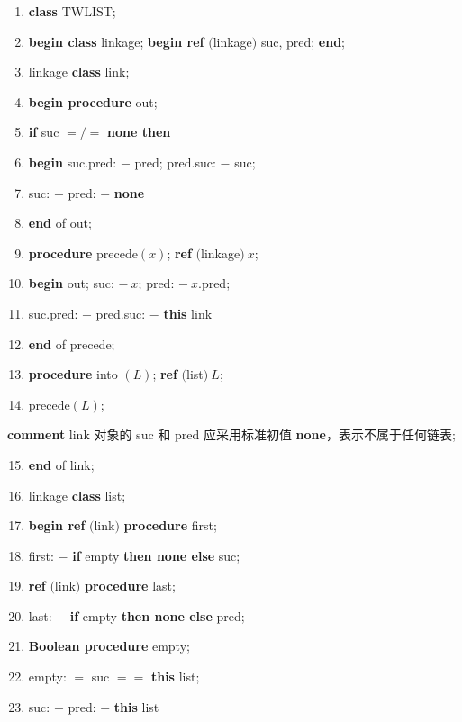 \documentclass[twoside,11pt,fontset=none]{ctexbook}
\begin{document}
\begin{enumerate}[nosep, label=\arabic*.]
	\item \textbf{class} TWLIST;
	\item \textbf{begin class} linkage; \textbf{begin ref} $($linkage$)$ suc, pred; \textbf{end};
	\item \quad linkage \textbf{class} link;
	\item \quad \textbf{begin procedure} out;
	\item \quad \quad \textbf{if} suc $=/=$ \textbf{none then}
	\item \quad \quad \textbf{begin} suc.pred: $-$ pred; pred.suc: $-$ suc;
	\item \quad \quad \quad suc: $-$ pred: $-$ \textbf{none}
	\item \quad \quad \textbf{end} of out;
	\item \quad \quad \textbf{procedure} precede$(x)$; \textbf{ref} $($linkage$)\ x$;
	\item \quad \quad \textbf{begin} out; suc: $-\ x$; pred: $-\ x$.pred;
	\item \quad \quad \quad suc.pred: $-$ pred.suc: $-$ \textbf{this} link
	\item \quad \quad \textbf{end} of precede;
	\item \quad \quad \textbf{procedure} into $(L)$; \textbf{ref} $($list$)\ L$;
	\item \quad \quad \quad precede$(L)$;
\end{enumerate}

\parindent\quad \quad \quad \textbf{comment} link 对象的 suc 和 pred 应采用标准初值 \textbf{none}，表示不属于任何链表;

\begin{enumerate}[nosep, label=\arabic*.]
	\setcounter{enumi}{14}
	\item \quad \textbf{end} of link;
	\item \quad linkage \textbf{class} list;
	\item \quad \textbf{begin ref} $($link$)$ \textbf{procedure} first;
	\item \quad \quad \quad first: $-$ \textbf{if} empty \textbf{then none else} suc;
	\item \quad \quad \textbf{ref} $($link$)$ \textbf{procedure} last;
	\item \quad \quad \quad last: $-$ \textbf{if} empty \textbf{then none else} pred;
	\item \quad \quad \textbf{Boolean procedure} empty;
	\item \quad \quad \quad empty: $=$ suc $==$ \textbf{this} list;
	\item \quad \quad \quad suc: $-$ pred: $-$ \textbf{this} list
\end{enumerate}
\end{document}
